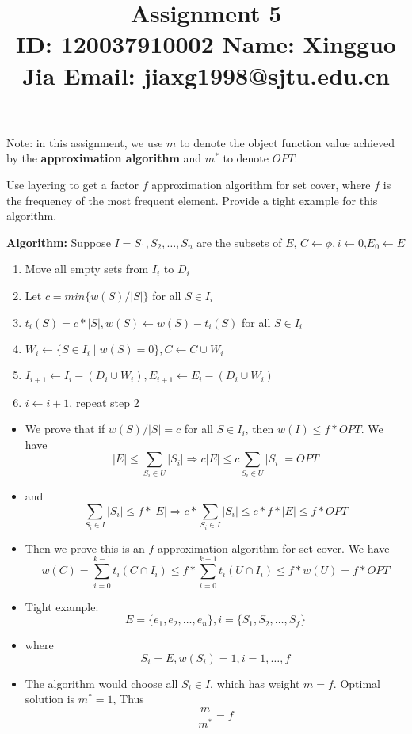 \documentclass{article}
\title{{\bf Assignment 5} \\ {\large ID: 120037910002 } {\large Name: Xingguo Jia } {\large Email: jiaxg1998@sjtu.edu.cn}}
\author{}
\date{}
\newcounter{exercise}
\newcommand{\<}{
    \langle}
\renewcommand{\>}{
    \rangle}
\begin{document}
\maketitle


{\large
Note: in this assignment, we use $m$ to denote the object function value achieved by the \textbf{approximation algorithm} and $m^*$ to denote $OPT$.
\newline

\begin{exercise}
Use layering to get a factor $f$ approximation algorithm for set cover,
where $f$ is the frequency of the most frequent element. Provide a tight example
for this algorithm.

\end{exercise}

\textbf{Algorithm:}
Suppose $I={S_1,S_2,\ldots,S_n}$ are the subsets of $E$, $C\leftarrow \phi,i\leftarrow 0$,$E_0\leftarrow E$
\begin{enumerate}
	\item Move all empty sets from $I_i$ to $D_i$
	\item Let $c=min\{w(S)/|S|\}$ for all $S\in I_i$
	\item $t_i(S)=c*|S|,w(S)\leftarrow w(S)-t_i(S)$ for all $S\in I_i$
	\item $W_i\leftarrow \{S\in I_i \mid w(S)=0\},C\leftarrow C\cup W_i$
	\item $I_{i+1}\leftarrow I_{i}-(D_i\cup W_i), E_{i+1}\leftarrow E_{i}-(D_i\cup W_i)$
	\item $i\leftarrow i+1$, repeat step 2
\end{enumerate}
\begin{itemize}
	\item We prove that if $w(S)/|S|=c$ for all $S\in I_i$, then $w(I)\leq f*OPT$. We have
	$$
	|E|\leq \sum_{S_i\in U}{|S_i|} \Rightarrow c|E|\leq c\sum_{S_i\in U}{|S_i|}=OPT
	$$
	\item and
	$$
	\sum_{S_i\in I}{|S_i|}\leq f*|E|\Rightarrow c*\sum_{S_i\in I}{|S_i|}\leq c*f*|E|\leq f*OPT
	$$
	\item Then we prove this is an $f$ approximation algorithm for set cover. We have
	$$
	w(C)=\sum_{i=0}^{k-1}{t_i(C\cap I_i)}\leq f*\sum_{i=0}^{k-1}{t_i(U\cap I_i)}\leq f*w(U)=f*OPT
	$$
	\item Tight example:
	$$
	E=\{e_1,e_2,\ldots,e_n\},i=\{S_1,S_2,\ldots,S_f\}
	$$
	\item where
	$$
	S_i=E,w(S_i)=1,i=1,\ldots,f
	$$
	\item The algorithm would choose all $S_i\in I$, which has weight $m=f$. Optimal solution is $m^*=1$, Thus
	$$
	\frac{m}{m^*}=f
	$$
\end{itemize}


}
\end{document}
